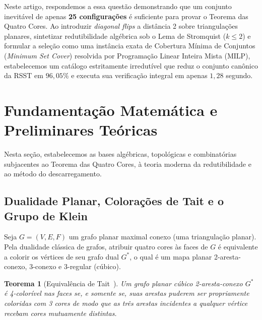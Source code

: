 \documentclass[11pt,a4paper]{article}
\theoremstyle{plain}
\newtheorem{theorem}{Teorema}[section]
\theoremstyle{definition}
\begin{document}
Neste artigo, respondemos a essa questão demonstrando que um conjunto inevitável de apenas \textbf{25 configurações} é suficiente para provar o Teorema das Quatro Cores. Ao introduzir \emph{diagonal flips} a distância 2 sobre triangulações planares, sintetizar redutibilidade algébrica sob o Lema de Stromquist ($k \le 2$) e formular a seleção como uma instância exata de Cobertura Mínima de Conjuntos (\emph{Minimum Set Cover}) resolvida por Programação Linear Inteira Mista (MILP), estabelecemos um catálogo estritamente irredutível que reduz o conjunto canônico da RSST em $96,05\%$ e executa sua verificação integral em apenas $1,28$ segundo.

\section{Fundamentação Matemática e Preliminares Teóricas}

Nesta seção, estabelecemos as bases algébricas, topológicas e combinatórias subjacentes ao Teorema das Quatro Cores, à teoria moderna da redutibilidade e ao método do descarregamento.

\subsection{Dualidade Planar, Colorações de Tait e o Grupo de Klein}

Seja $G = (V, E, F)$ um grafo planar maximal conexo (uma triangulação planar). Pela dualidade clássica de grafos, atribuir quatro cores às faces de $G$ é equivalente a colorir os vértices de seu grafo dual $G^*$, o qual é um mapa planar 2-aresta-conexo, 3-conexo e 3-regular (cúbico).

\begin{theorem}[Equivalência de Tait~\cite{tait1880remarks}]
Um grafo planar cúbico 2-aresta-conexo $G^*$ é 4-colorível nas faces se, e somente se, suas arestas puderem ser propriamente coloridas com 3 cores de modo que as três arestas incidentes a qualquer vértice recebam cores mutuamente distintas.
\end{theorem}
\end{document}
